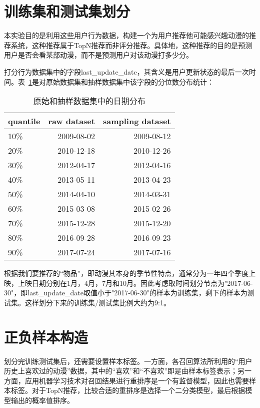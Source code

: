   \section{训练集和测试集划分}
  本实验目的是利用这些用户行为数据，构建一个为用户推荐他可能感兴趣动漫的推荐系统，这种推荐属于TopN推荐而非评分推荐。具体地，这种推荐的目的是预测用户是否会看某部动漫，而不是预测用户对该动漫打多少分。

  打分行为数据集中的字段last\_update\_date，其含义是用户更新状态的最后一次时间。表~\ref{tab:date_distribution}是对原始数据集和抽样数据集中该字段的分位数分布统计：
  \begin{table}[htbp]
    \centering
    \caption{原始和抽样数据集中的日期分布}
      \begin{tabular}{lrr}
      \toprule
      quantile & raw dataset & sampling dataset \\
      \midrule
      10\% & 2009-08-02 & 2009-08-12 \\
      20\% & 2010-12-18 & 2010-12-26 \\
      30\% & 2012-04-17 & 2012-04-16 \\
      40\% & 2013-05-11 & 2013-04-23 \\
      50\% & 2014-04-10 & 2014-03-31 \\
      60\% & 2015-03-08 & 2015-02-26 \\
      70\% & 2015-12-28 & 2015-12-20 \\
      80\% & 2016-09-28 & 2016-09-23 \\
      90\% & 2017-07-24 & 2017-07-16 \\
      \bottomrule
      \end{tabular}%
    \label{tab:date_distribution}%
  \end{table}%

  根据我们要推荐的“物品”，即动漫其本身的季节性特点，通常分为一年四个季度上映，上映日期分别在1月，4月，7月和10月。因此考虑取时间划分节点为"2017-06-30"，即last\_update\_date取值小于"2017-06-30"的样本为训练集，剩下的样本为测试集。这样划分下来的训练集/测试集比例大约为9:1。

  \section{正负样本构造}
  划分完训练测试集后，还需要设置样本标签。一方面，各召回算法所利用的“用户历史上喜欢过的动漫”数据，其中的“喜欢”和“不喜欢”即是由样本标签表示；另一方面，应用机器学习技术对召回结果进行重排序是一个有监督模型，因此也需要样本标签。对于TopN推荐，比较合适的重排序是选择一个二分类模型，最后根据模型输出的概率值排序。

